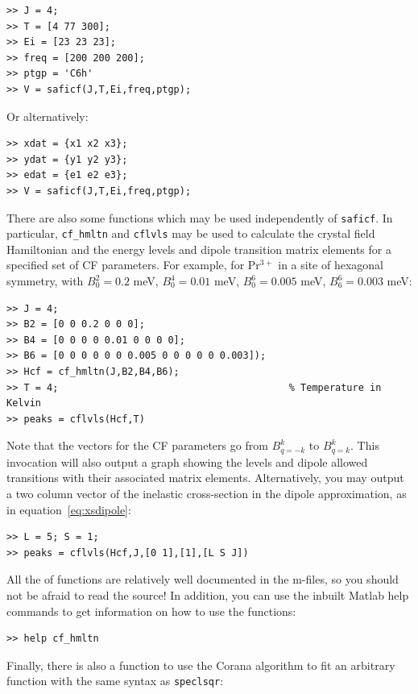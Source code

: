 \documentclass[12pt,onecolumn,tightenlines,aps,amsmath,floatfix,notitlepage,nofootinbib]{revtex4}
\begin{document}
\begin{verbatim}
>> J = 4;
>> T = [4 77 300];
>> Ei = [23 23 23];
>> freq = [200 200 200];
>> ptgp = 'C6h'
>> V = saficf(J,T,Ei,freq,ptgp);
\end{verbatim}

\noindent Or alternatively:

\begin{verbatim}
>> xdat = {x1 x2 x3};
>> ydat = {y1 y2 y3};
>> edat = {e1 e2 e3};
>> V = saficf(J,T,Ei,freq,ptgp);
\end{verbatim}

There are also some functions which may be used independently of \texttt{saficf}. In particular, \texttt{cf\_hmltn} and \texttt{cflvls} may be used to calculate the crystal field Hamiltonian and the energy levels and dipole transition matrix elements for a specified set of CF parameters. For example, for Pr$^{3+}$ in a site of hexagonal symmetry, with $B_0^2 = 0.2$ meV,  $B_0^4 = 0.01$ meV,  $B_0^6 = 0.005$ meV, $B_6^6 = 0.003$ meV: 

\begin{verbatim}
>> J = 4;
>> B2 = [0 0 0.2 0 0 0];
>> B4 = [0 0 0 0 0.01 0 0 0 0];
>> B6 = [0 0 0 0 0 0 0.005 0 0 0 0 0 0.003]);
>> Hcf = cf_hmltn(J,B2,B4,B6);
>> T = 4;                                        % Temperature in Kelvin 
>> peaks = cflvls(Hcf,T)
\end{verbatim}

\noindent Note that the vectors for the CF parameters go from $B_{q=-k}^k$ to $B_{q=k}^k$. This invocation will also output a graph showing the levels and dipole allowed transitions with their associated matrix elements. Alternatively, you may output a two column vector of the inelastic cross-section in the dipole approximation, as in equation~\ref{eq:xsdipole}:

\begin{verbatim}
>> L = 5; S = 1;
>> peaks = cflvls(Hcf,J,[0 1],[1],[L S J])
\end{verbatim}

All the of functions are relatively well documented in the m-files, so you should not be afraid to read the source! In addition, you can use the inbuilt Matlab help commands to get information on how to use the functions:

\begin{verbatim}
>> help cf_hmltn
\end{verbatim}

Finally, there is also a function to use the Corana algorithm to fit an arbitrary function with the same syntax as \texttt{speclsqr}:
\end{document}
